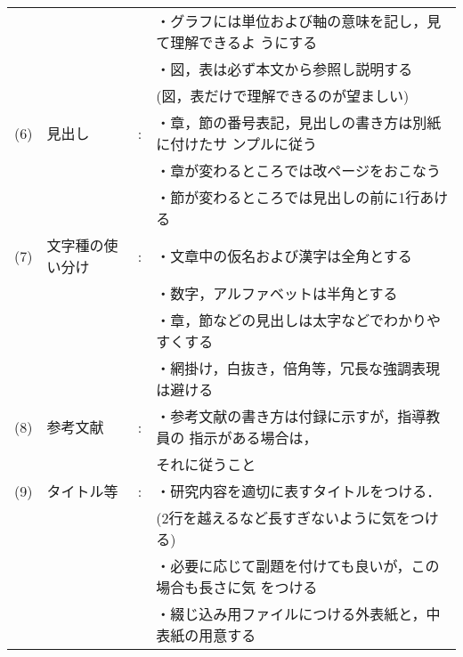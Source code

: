 \begin{tabular}{llcl}
      &                           &   & ・グラフには単位および軸の意味を記し，見て理解できるよ
  うにする                                                                                       \\
      &                           &   & ・図，表は必ず本文から参照し説明する                     \\
      &                           &   & \hspace*{1zw}(図，表だけで理解できるのが望ましい)        \\
  (6) & 見出し                    & : & ・章，節の番号表記，見出しの書き方は別紙に付けたサ
  ンプルに従う                                                                                   \\
      &                           &   & ・章が変わるところでは改ページをおこなう                 \\
      &                           &   & ・節が変わるところでは見出しの前に1行あける              \\
  (7) & 文字種の使い分け          & : & ・文章中の仮名および漢字は全角とする                     \\
      &                           &   & ・数字，アルファベットは半角とする                       \\
      &                           &   & ・章，節などの見出しは太字などでわかりやすくする         \\
      &                           &   & ・網掛け，白抜き，倍角等，冗長な強調表現は避ける         \\
  (8) & 参考文献                  & : & ・参考文献の書き方は付録に示すが，指導教員の
  指示がある場合は，                                                                             \\
      &                           &   & \hspace*{1zw}それに従うこと                              \\
  (9) & タイトル等                & : & ・研究内容を適切に表すタイトルをつける．                 \\
      &                           &   & \hspace*{1zw}(2行を越えるなど長すぎないように気をつける) \\
      &                           &   & ・必要に応じて副題を付けても良いが，この場合も長さに気
  をつける                                                                                       \\
      &                           &   & ・綴じ込み用ファイルにつける外表紙と，中表紙の用意する   \\

\end{tabular}
